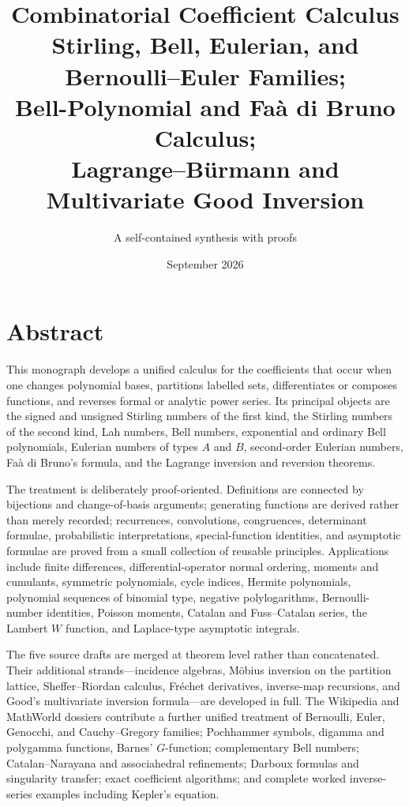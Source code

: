 \documentclass[11pt,a4paper,oneside,openany]{book}
\title{\Huge\bfseries Combinatorial Coefficient Calculus\\[3mm]
\Large Stirling, Bell, Eulerian, and Bernoulli--Euler Families;\\
Bell-Polynomial and Fa\`a di Bruno Calculus;\\
Lagrange--B\"urmann and Multivariate Good Inversion}
\author{A self-contained synthesis with proofs}
\date{September 2026}
\theoremstyle{definition}
\theoremstyle{remark}
\begin{document}
\frontmatter
\hypersetup{pageanchor=false}
\maketitle
\hypersetup{pageanchor=true}

\chapter*{Abstract}
This monograph develops a unified calculus for the coefficients that occur when one
changes polynomial bases, partitions labelled sets, differentiates or composes
functions, and reverses formal or analytic power series.  Its principal objects are
the signed and unsigned Stirling numbers of the first kind, the Stirling numbers of
the second kind, Lah numbers, Bell numbers, exponential and ordinary Bell
polynomials, Eulerian numbers of types $A$ and $B$, second-order Eulerian numbers,
Fa\`a di Bruno's formula, and the Lagrange inversion and reversion theorems.

The treatment is deliberately proof-oriented.  Definitions are connected by
bijections and change-of-basis arguments; generating functions are derived rather
than merely recorded; recurrences, convolutions, congruences, determinant formulae,
probabilistic interpretations, special-function identities, and asymptotic formulae
are proved from a small collection of reusable principles.  Applications include
finite differences, differential-operator normal ordering, moments and cumulants,
symmetric polynomials, cycle indices, Hermite polynomials, polynomial sequences of
binomial type, negative polylogarithms, Bernoulli-number identities, Poisson moments,
Catalan and Fuss--Catalan series, the Lambert $W$ function, and Laplace-type
asymptotic integrals.

The five source drafts are merged at theorem level rather than concatenated.  Their
additional strands---incidence algebras, M\"obius inversion on the partition lattice,
Sheffer--Riordan calculus, Fr\'echet derivatives, inverse-map recursions,
and Good's multivariate inversion formula---are developed in full.  The
Wikipedia and MathWorld dossiers contribute a further unified treatment of Bernoulli,
Euler, Genocchi, and Cauchy--Gregory families; Pochhammer symbols, digamma and polygamma
functions, Barnes' $G$-function; complementary Bell numbers; Catalan--Narayana and
associahedral refinements; Darboux formulas and singularity transfer; exact coefficient
algorithms; and complete worked inverse-series examples including Kepler's equation.
\end{document}
